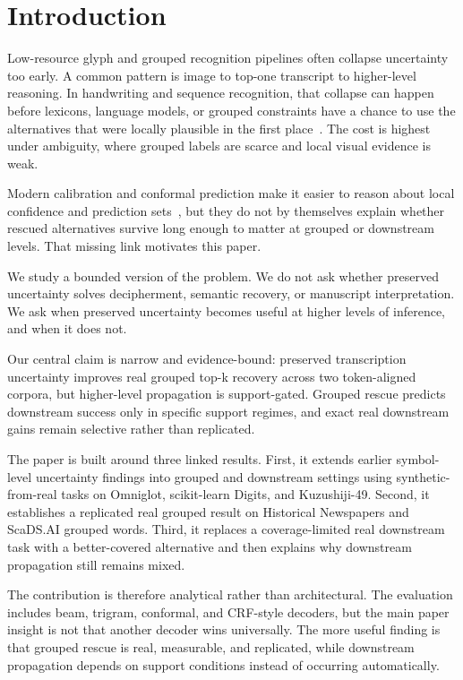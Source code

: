 \section{Introduction}

Low-resource glyph and grouped recognition pipelines often collapse uncertainty too early. A common pattern is image to top-one transcript to higher-level reasoning. In handwriting and sequence recognition, that collapse can happen before lexicons, language models, or grouped constraints have a chance to use the alternatives that were locally plausible in the first place~\cite{plamondon2000handwriting,graves2006ctc,scheidl2018wordbeam}. The cost is highest under ambiguity, where grouped labels are scarce and local visual evidence is weak.

Modern calibration and conformal prediction make it easier to reason about local confidence and prediction sets~\cite{guo2017calibration,angelopoulos2021conformal}, but they do not by themselves explain whether rescued alternatives survive long enough to matter at grouped or downstream levels. That missing link motivates this paper.

We study a bounded version of the problem. We do not ask whether preserved uncertainty solves decipherment, semantic recovery, or manuscript interpretation. We ask when preserved uncertainty becomes useful at higher levels of inference, and when it does not.

Our central claim is narrow and evidence-bound: preserved transcription uncertainty improves real grouped top-k recovery across two token-aligned corpora, but higher-level propagation is support-gated. Grouped rescue predicts downstream success only in specific support regimes, and exact real downstream gains remain selective rather than replicated.

The paper is built around three linked results. First, it extends earlier symbol-level uncertainty findings into grouped and downstream settings using synthetic-from-real tasks on Omniglot, scikit-learn Digits, and Kuzushiji-49. Second, it establishes a replicated real grouped result on Historical Newspapers and ScaDS.AI grouped words. Third, it replaces a coverage-limited real downstream task with a better-covered alternative and then explains why downstream propagation still remains mixed.

The contribution is therefore analytical rather than architectural. The evaluation includes beam, trigram, conformal, and CRF-style decoders, but the main paper insight is not that another decoder wins universally. The more useful finding is that grouped rescue is real, measurable, and replicated, while downstream propagation depends on support conditions instead of occurring automatically.
